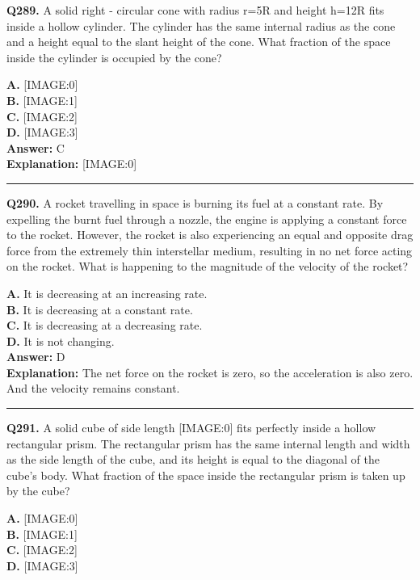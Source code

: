 \documentclass[12pt]{article}
\begin{document}
\noindent
\textbf{Q289.} A solid right - circular cone with radius r=5R and height h=12R fits inside a hollow cylinder. The cylinder has the same internal radius as the cone and a height equal to the slant height of the cone. What fraction of the space inside the cylinder is occupied by the cone?



\textbf{A.} [IMAGE:0] \\
\textbf{B.} [IMAGE:1] \\
\textbf{C.} [IMAGE:2] \\
\textbf{D.} [IMAGE:3] \\

\textbf{Answer:} C \\
\textbf{Explanation:} [IMAGE:0]

\hrule
\vspace{1em}


\noindent
\textbf{Q290.} A rocket travelling in space is burning its fuel at a constant rate. By expelling the burnt fuel through a nozzle, the engine is applying a constant force to the rocket. However, the rocket is also experiencing an equal and opposite drag force from the extremely thin interstellar medium, resulting in no net force acting on the rocket.
What is happening to the magnitude of the velocity of the rocket?



\textbf{A.} It is decreasing at an increasing rate. \\
\textbf{B.} It is decreasing at a constant rate. \\
\textbf{C.} It is decreasing at a decreasing rate. \\
\textbf{D.} It is not changing. \\

\textbf{Answer:} D \\
\textbf{Explanation:} The net force on the rocket is zero, so the acceleration is also zero. And the velocity remains constant.

\hrule
\vspace{1em}


\noindent
\textbf{Q291.} A solid cube of side length
[IMAGE:0]
fits perfectly inside a hollow rectangular prism. The rectangular prism has the same internal length and width as the side length of the cube, and its height is equal to the diagonal of the cube's body. What fraction of the space inside the rectangular prism is taken up by the cube?



\textbf{A.} [IMAGE:0] \\
\textbf{B.} [IMAGE:1] \\
\textbf{C.} [IMAGE:2] \\
\textbf{D.} [IMAGE:3] \\
\end{document}
